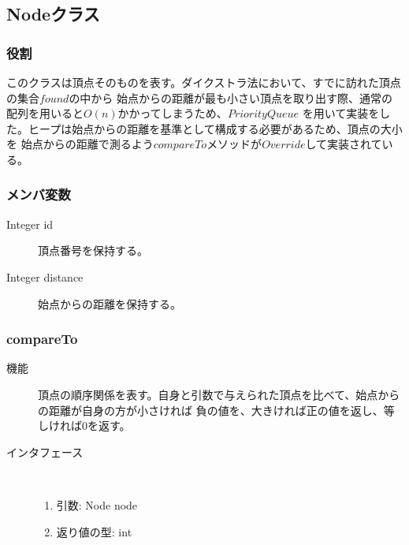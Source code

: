 \documentclass[a4j]{jarticle}
\begin{document}
\subsection{Nodeクラス}

\subsubsection{役割}
このクラスは頂点そのものを表す。ダイクストラ法において、すでに訪れた頂点の集合\(found\)の中から
始点からの距離が最も小さい頂点を取り出す際、通常の配列を用いると\(O(n)\)かかってしまうため、\(PriorityQueue\)
を用いて実装をした。ヒープは始点からの距離を基準として構成する必要があるため、頂点の大小を
始点からの距離で測るよう\(compareTo\)メソッドが\(Override\)して実装されている。

\subsubsection{メンバ変数}

\begin{description}
\item[Integer id]
頂点番号を保持する。

\item[Integer distance]
始点からの距離を保持する。

\end{description}

\subsubsection{compareTo}

\begin{description}
\item[機能]
頂点の順序関係を表す。自身と引数で与えられた頂点を比べて、始点からの距離が自身の方が小さければ
負の値を、大きければ正の値を返し、等しければ0を返す。

\item[インタフェース]\ \vspace{0mm}
\begin{enumerate}
  \item 引数: Node node
  \item 返り値の型: int
\end{enumerate}
\end{description}
\end{document}
